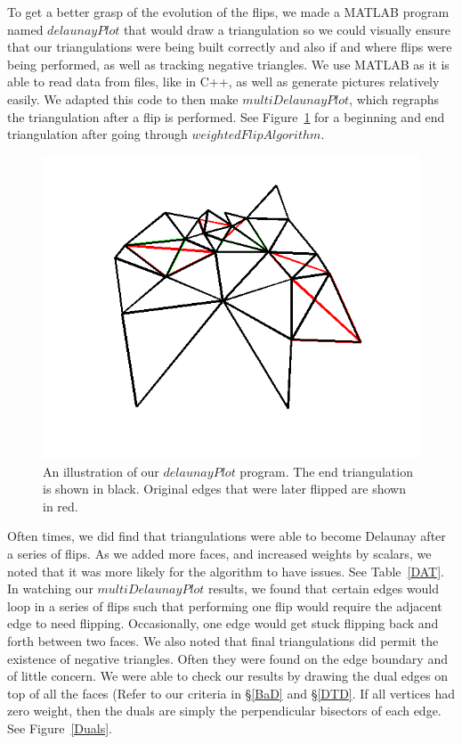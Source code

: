 \documentclass[12pt]{article}
\begin{document}
\noindent To get a better grasp of the evolution of the flips, we made a MATLAB program named $delaunayPlot$ that would draw a triangulation so we could visually ensure that our triangulations were being built correctly and also if and where flips were being performed, as well as tracking negative triangles. We use MATLAB as it is able to read data from files, like in C++, as well as generate pictures relatively easily. We adapted this code to then make $multiDelaunayPlot$, which regraphs the triangulation after a flip is performed. See Figure~\ref{genTri5} for a beginning and end triangulation after going through $weightedFlipAlgorithm$. \newline

\begin{figure}
\centering
\includegraphics[scale = 0.7]{Pictures/genTri5v2.png}
\caption{An illustration of our $delaunayPlot$ program. The end triangulation is shown in black. Original edges that were later flipped are shown in red.}
\label{genTri5}
\end{figure}

\noindent Often times, we did find that triangulations were able to become Delaunay after a series of flips. As we added more faces, and increased weights by scalars, we noted that it was more likely for the algorithm to have issues. See Table~\ref{DAT}. In watching our $multiDelaunayPlot$ results, we found that certain edges would loop in a series of flips such that performing one flip would require the adjacent edge to need flipping. Occasionally, one edge would get stuck flipping back and forth between two faces. We also noted that final triangulations did permit the existence of negative triangles. Often they were found on the edge boundary and of little concern. We were able to check our results by drawing the dual edges on top of all the faces (Refer to our criteria in \S\ref{BaD} and \S\ref{DTD}. If all vertices had zero weight, then the duals are simply the perpendicular bisectors of each edge. See Figure~\ref{Duals}. \newline
\end{document}

